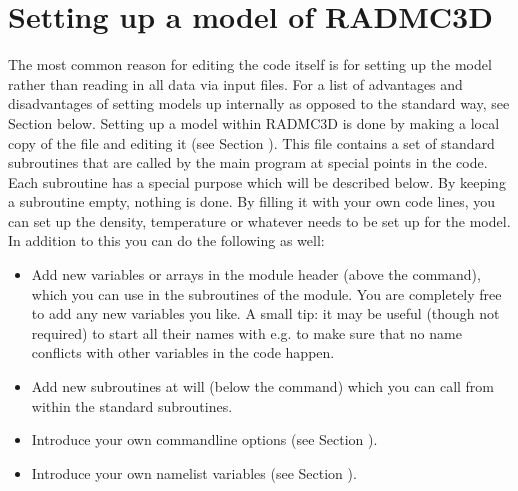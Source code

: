 \documentclass[letterpaper,10pt,english]{sphinxmanual}
\begin{document}
\section{Setting up a model  of RADMC\sphinxhyphen{}3D}
\label{\detokenize{internalsetup:setting-up-a-model-inside-of-radmc-3d}}
The most common reason for editing the code itself is for setting up the
model  rather than reading in all data via input files. For
a list of advantages and disadvantages of setting models up internally as
opposed to the standard way, see Section {\hyperref[\detokenize{internalsetup:sec-internalsetup-proscons}]{}}
below. Setting up a model within RADMC\sphinxhyphen{}3D is done by making a local copy of
the file  and editing it (see Section
{\hyperref[\detokenize{installation:sec-special-purpose-compile}]{}}). This file contains a set of standard
subroutines that are called by the main program at special points in the
code. Each subroutine has a special purpose which will be described below.
By keeping a subroutine empty, nothing is done. By filling it with your own
code lines, you can set up the density, temperature or whatever needs to be
set up for the model. In addition to this you can do the following as well:
\begin{itemize}
\item {} 
Add new variables or arrays in the module header (above the 
command), which you can use in the subroutines of the 
module. You are completely free to add any new variables you like. A small
tip: it may be useful (though not required) to start all their names with
e.g.  to make sure that no name conflicts with other variables in
the code happen.

\item {} 
Add new subroutines at will (below the  command) which you can
call from within the standard subroutines.

\item {} 
Introduce your own  command\sphinxhyphen{}line options (see Section
{\hyperref[\detokenize{internalsetup:sec-predef-userdef}]{}}).

\item {} 
Introduce your own  namelist variables (see Section
{\hyperref[\detokenize{internalsetup:sec-predef-userdef}]{}}).

\end{itemize}
\end{document}
